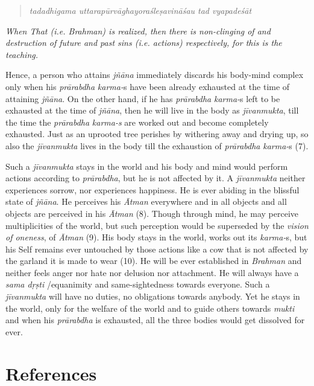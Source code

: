 \begin{verse}
\emph{tadadhigama uttarapūrvāghayoraśleṣavināśau tad vyapadeśāt~}
\end{verse}

\emph{When That (i.e. Brahman) is realized, then there is non-clinging of and destruction of future and past sins (i.e. actions) respectively, for this is the teaching.}

Hence, a person who attains \emph{jñāna} immediately discards his body-mind complex only when his \emph{prārabdha} \emph{karma-}s have been already exhausted at the time of attaining \emph{jñāna}. On the other hand, if he has \emph{prārabdha} \emph{karma-}s left to be exhausted at the time of \emph{jñāna}, then he will live in the body as \emph{jīvanmukta}, till the time the \emph{prārabdha} \emph{karma-s} are worked out and become completely exhausted. Just as an uprooted tree perishes by withering away and drying up, so also the \emph{jīvanmukta} lives in the body till the exhaustion of \emph{prārabdha} \emph{karma-}s (7).

Such a \emph{jīvanmukta} stays in the world and his body and mind would perform actions according to \emph{prārabdha}, but he is not affected by it. A \emph{jīvanmukta} neither experiences sorrow, nor experiences happiness. He is ever abiding in the blissful state of \emph{jñāna}. He perceives his \emph{Ātman} everywhere and in all objects and all objects are perceived in his \emph{Ātman} (8). Though through mind, he may perceive multiplicities of the world, but such perception would be superseded by the \emph{vision of oneness}, of \emph{Ātman} (9). His body stays in the world, works out its \emph{karma-}s, but his Self remains ever untouched by those actions like a cow that is not affected by the garland it is made to wear (10). He will be ever established in \emph{Brahman} and neither feels anger nor hate nor delusion nor attachment. He will always have a \emph{sama dṛṣti} /equanimity and same-sightedness towards everyone. Such a \emph{jīvanmukta} will have no duties, no obligations towards anybody. Yet he stays in the world, only for the welfare of the world and to guide others towards \emph{mukti} and when his \emph{prārabdha} is exhausted, all the three bodies would get dissolved for ever.

\section*{References}

